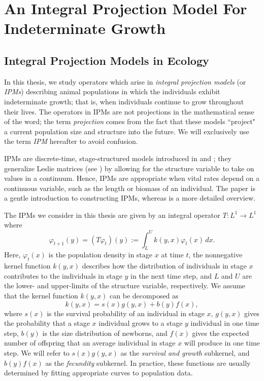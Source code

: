 \chapter{An Integral Projection Model For Indeterminate Growth}

\section{Integral Projection Models in Ecology} \label{section:ipmsinecology}

In this thesis, we study operators which arise in \emph{integral projection models} (or \emph{IPMs}) describing animal populations in which the individuals exhibit indeterminate growth; that is, when individuals continue to grow throughout their lives. The operators in IPMs are not projections in the mathematical sense of the word; the term \emph{projection} comes from the fact that these models ``project" a current population size and structure into the future. We will exclusively use the term \emph{IPM} hereafter to avoid confusion.

IPMs are discrete-time, stage-structured models introduced in \cite{Easterling1998} and \cite{Ellner2006}; they generalize Leslie matrices (see \cite{Caswell2001}) by allowing for the structure variable to take on values in a continuum. Hence, IPMs are appropriate when vital rates depend on a continuous variable, such as the length or biomass of an individual. The paper \cite{Briggs2010} is a gentle introduction to constructing IPMs, whereas \cite{Ellner2016} is a more detailed overview.

The IPMs we consider in this thesis are given by an integral operator $T:L^1 \to L^1$ where
\[\varphi_{t+1}(y) = (T\varphi_t)(y) := \int_L^U k(y,x) \varphi_t(x) \, dx.\]
Here, $\varphi_{t}(x)$ is the population density in stage $x$ at time $t$, the nonnegative kernel function $k(y,x)$ describes how the distribution of individuals in stage $x$ contributes to the individuals in stage $y$ in the next time step, and $L$ and $U$ are the lower- and upper-limits of the structure variable, respectively. We assume that the kernel function $k(y,x)$ can be decomposed as 
\[k(y, x) = s(x) g(y,x) + b(y)f(x),\]
where $s(x)$ is the survival probability of an individual in stage $x$, $g(y,x)$ gives the probability that a stage $x$ individual grows to a stage $y$ individual in one time step, $b(y)$ is the size distribution of newborns, and $f(x)$ gives the expected number of offspring that an average individual in stage $x$ will produce in one time step. We will refer to $s(x)g(y,x)$ as the \emph{survival and growth} subkernel, and $b(y)f(x)$ as the \emph{fecundity} subkernel. In practice, these functions are usually determined by fitting appropriate curves to population data.


